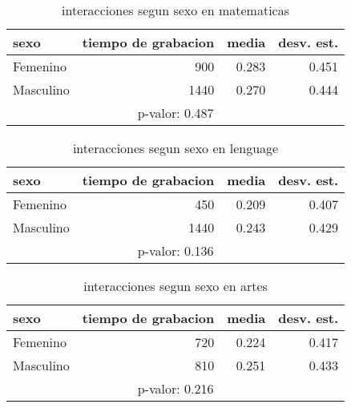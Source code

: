\documentclass[spanish]{article}
\begin{document}
\begin{table}[h!]
\begin{center}
\begin{tabular}{|l|r|r|r|}
\hline
sexo      & tiempo de grabacion & media          & desv. est.    \\ \hline
Femenino  &                 900 &          0.283 &          0.451\\ \hline
Masculino &                1440 &          0.270 &          0.444\\ \hline
\multicolumn{4}{|c|}{p-valor: 0.487} \\ \hline
\end{tabular}
\caption{interacciones segun sexo en matematicas}
\end{center}
\end{table}
\clearpage
\begin{table}[h!]
\begin{center}
\begin{tabular}{|l|r|r|r|}
\hline
sexo      & tiempo de grabacion & media          & desv. est.    \\ \hline
Femenino  &                 450 &          0.209 &          0.407\\ \hline
Masculino &                1440 &          0.243 &          0.429\\ \hline
\multicolumn{4}{|c|}{p-valor: 0.136} \\ \hline
\end{tabular}
\caption{interacciones segun sexo en lenguage}
\end{center}
\end{table}

\begin{table}[h!]
\begin{center}
\begin{tabular}{|l|r|r|r|}
\hline
sexo      & tiempo de grabacion & media          & desv. est.    \\ \hline
Femenino  &                 720 &          0.224 &          0.417\\ \hline
Masculino &                 810 &          0.251 &          0.433\\ \hline
\multicolumn{4}{|c|}{p-valor: 0.216} \\ \hline
\end{tabular}
\caption{interacciones segun sexo en artes}
\end{center}
\end{table}
\end{document}

